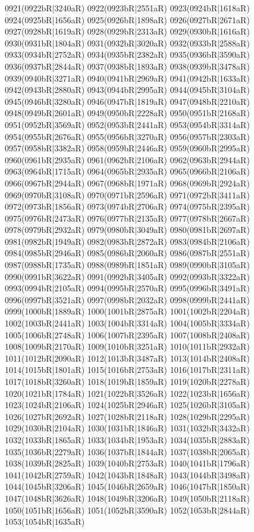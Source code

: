 0921(0922bR|3240aR) 0922(0923bR|2551aR) 0923(0924bR|1618aR) 0924(0925bR|1656aR) 0925(0926bR|1898aR) 0926(0927bR|2671aR) \\0927(0928bR|1619aR) 0928(0929bR|2313aR) 0929(0930bR|1616aR) 0930(0931bR|1804aR) 0931(0932bR|3020aR) 0932(0933bR|2588aR) 0933(0934bR|2752aR) 0934(0935bR|2382aR) 0935(0936bR|3590aR) \\0936(0937bR|2844aR) 0937(0938bR|1893aR) 0938(0939bR|3478aR) 0939(0940bR|3271aR) 0940(0941bR|2969aR) 0941(0942bR|1633aR) 0942(0943bR|2880aR) 0943(0944bR|2995aR) 0944(0945bR|3104aR) \\0945(0946bR|3280aR) 0946(0947bR|1819aR) 0947(0948bR|2210aR) 0948(0949bR|2601aR) 0949(0950bR|2228aR) 0950(0951bR|2168aR) 0951(0952bR|3569aR) 0952(0953bR|2441aR) 0953(0954bR|3314aR) \\0954(0955bR|2676aR) 0955(0956bR|3270aR) 0956(0957bR|2303aR) 0957(0958bR|3382aR) 0958(0959bR|2446aR) 0959(0960bR|2995aR) 0960(0961bR|2935aR) 0961(0962bR|2106aR) 0962(0963bR|2944aR) \\0963(0964bR|1715aR) 0964(0965bR|2935aR) 0965(0966bR|2106aR) 0966(0967bR|2944aR) 0967(0968bR|1971aR) 0968(0969bR|2924aR) 0969(0970bR|3108aR) 0970(0971bR|2596aR) 0971(0972bR|3411aR) \\0972(0973bR|1856aR) 0973(0974bR|2706aR) 0974(0975bR|2395aR) 0975(0976bR|2473aR) 0976(0977bR|2135aR) 0977(0978bR|2667aR) 0978(0979bR|2932aR) 0979(0980bR|3049aR) 0980(0981bR|2697aR) \\0981(0982bR|1949aR) 0982(0983bR|2872aR) 0983(0984bR|2106aR) 0984(0985bR|2946aR) 0985(0986bR|2060aR) 0986(0987bR|2551aR) 0987(0988bR|1735aR) 0988(0989bR|1851aR) 0989(0990bR|3105aR) \\0990(0991bR|3622aR) 0991(0992bR|3405aR) 0992(0993bR|3322aR) 0993(0994bR|2105aR) 0994(0995bR|2570aR) 0995(0996bR|3491aR) 0996(0997bR|3521aR) 0997(0998bR|2032aR) 0998(0999bR|2441aR) \\0999(1000bR|1889aR) 1000(1001bR|2875aR) 1001(1002bR|2204aR) 1002(1003bR|2441aR) 1003(1004bR|3314aR) 1004(1005bR|3334aR) 1005(1006bR|2748aR) 1006(1007bR|2395aR) 1007(1008bR|2408aR) \\1008(1009bR|2170aR) 1009(1010bR|3251aR) 1010(1011bR|2932aR) 1011(1012bR|2090aR) 1012(1013bR|3487aR) 1013(1014bR|2408aR) 1014(1015bR|1801aR) 1015(1016bR|2753aR) 1016(1017bR|2311aR) \\1017(1018bR|3260aR) 1018(1019bR|1859aR) 1019(1020bR|2278aR) 1020(1021bR|1784aR) 1021(1022bR|3526aR) 1022(1023bR|1656aR) 1023(1024bR|2106aR) 1024(1025bR|2946aR) 1025(1026bR|3105aR) \\1026(1027bR|2692aR) 1027(1028bR|2118aR) 1028(1029bR|2295aR) 1029(1030bR|2104aR) 1030(1031bR|1846aR) 1031(1032bR|3432aR) 1032(1033bR|1865aR) 1033(1034bR|1953aR) 1034(1035bR|2883aR) \\1035(1036bR|2279aR) 1036(1037bR|1844aR) 1037(1038bR|2065aR) 1038(1039bR|2825aR) 1039(1040bR|2753aR) 1040(1041bR|1796aR) 1041(1042bR|2759aR) 1042(1043bR|1848aR) 1043(1044bR|3498aR) \\1044(1045bR|3206aR) 1045(1046bR|2659aR) 1046(1047bR|1850aR) 1047(1048bR|3626aR) 1048(1049bR|3206aR) 1049(1050bR|2118aR) 1050(1051bR|1656aR) 1051(1052bR|3590aR) 1052(1053bR|2844aR) \\1053(1054bR|1635aR) 